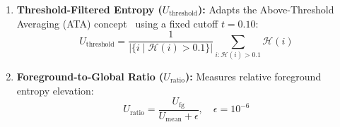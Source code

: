 \documentclass[10pt,journal,compsoc]{IEEEtran}
\begin{document}
\begin{enumerate}
    \begin{equation}
    U_{\mathrm{boundary}} = \frac{1}{|\mathcal{B}|} \sum_{i \in \mathcal{B}} \mathcal{H}(i)
    \end{equation}
    \item \textbf{Threshold-Filtered Entropy ($U_{\mathrm{threshold}}$):} Adapts the Above-Threshold Averaging (ATA) concept~\cite{guarino2026better} using a fixed cutoff $t=0.10$:
    \begin{equation}
    U_{\mathrm{threshold}} = \frac{1}{|\{i \mid \mathcal{H}(i) > 0.1\}|} \sum_{i: \mathcal{H}(i) > 0.1} \mathcal{H}(i)
    \end{equation}
    \item \textbf{Foreground-to-Global Ratio ($U_{\mathrm{ratio}}$):} Measures relative foreground entropy elevation:
    \begin{equation}
    U_{\mathrm{ratio}} = \frac{U_{\mathrm{fg}}}{U_{\mathrm{mean}} + \epsilon}, \quad \epsilon = 10^{-6}
    \end{equation}
\end{enumerate}
\end{document}
